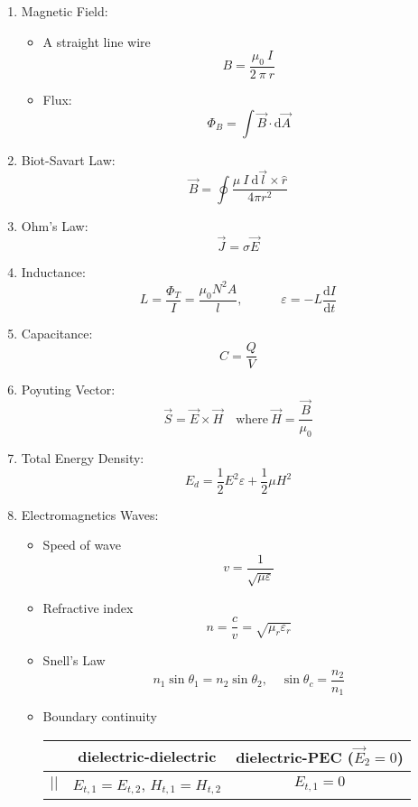 \documentclass[a4paper, 11pt]{article}
\begin{document}
\begin{multicols}{2}
\begin{enumerate}
    \item Magnetic Field:
    \begin{itemize}
        \item A straight line wire
        \[B = \frac{\mu_{0} \ I}{2 \ \pi \ r}\]
        \item Flux:
        \[\Phi_{B} = \int\vec{B} \cdot \mathrm{d}\vec{A}\]
    \end{itemize}

    \item Biot-Savart Law:
    \[ 
        \vec{B} = \oint\frac{\mu \ I \ \mathrm{d}\vec{l}\times \hat{r}}{4 \pi r^{2}}
    \]

    \item Ohm's Law:
    \[\vec{J} = \sigma \vec{E}\]
    
    \item Inductance:
    \[
        L = \frac{\Phi_{T}}{I}=\frac{\mu_{0}N^{2}A}{l}, \quad \quad \quad 
        \varepsilon = -L\frac{\mathrm{d}I}{\mathrm{d}t}
    \]

    \item Capacitance: 
    \[C = \frac{Q}{V}\]
    
    \item Poyuting Vector:
    \[\vec{S} = \vec{E}\times \vec{H}\quad \text{where} \ \vec{H}=\frac{\vec{B}}{\mu_{0}}\]

    \item Total Energy Density:
    \[
        E_{d}=\frac{1}{2}E^{2}\varepsilon+\frac{1}{2}\mu H^{2}
    \]

    
    \item Electromagnetics Waves:
    \begin{itemize}[leftmargin=*]
	\item Speed of wave 
        \[
            v=\frac{1}{\sqrt{\mu\varepsilon}}
        \]
        
	\item Refractive index 
        \[
            n=\frac{c}{v}=\sqrt{\mu_{r}\varepsilon_{r}}
        \]
	\item Snell's Law 
        \[
            n_{1}\sin\theta_{1} =n_{2}\sin\theta_{2}, \quad
            \sin\theta_{c}=\frac{n_{2}}{n_{1}}
        \]

	\item Boundary continuity 
		\begin{table}[H] 
            \centering
		\begin{tabular}{ccc}
		\toprule
            & dielectric-dielectric & dielectric-PEC ($\vec{E}_{2}=0$)\\
            \midrule
            $||$ & $E_{t,1}=E_{t,2}$,  $H_{t,1}=H_{t,2}$ & $E_{t,1}=0$ \\  [.2em] \hline 
            

\end{tabular}
\end{table}
\end{itemize}
\end{enumerate}
\end{multicols}
\end{document}
